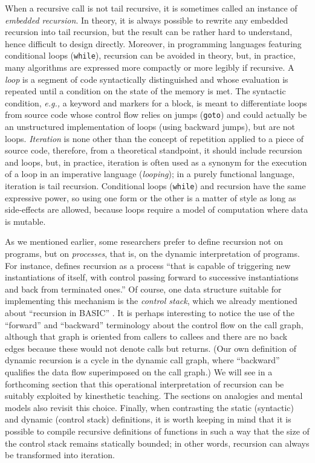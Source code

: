\documentclass[11pt,a4paper]{article}
\newcommand\plang[1]{\textsf{#1}\xspace}
\newcommand\exc[1]{\texttt{\small #1}}
\begin{document}
When a recursive call is not tail recursive, it is sometimes called an
instance of \emph{embedded recursion}. In theory, it is always
possible to rewrite any embedded recursion into tail recursion, but
the result can be rather hard to understand, hence difficult to design
directly. Moreover, in programming languages featuring conditional
loops (\exc{while}), recursion can be avoided in theory, but, in
practice, many algorithms are expressed more compactly or more legibly
if recursive.  A \emph{loop} is a segment of code syntactically
distinguished and whose evaluation is repeated until a condition on
the state of the memory is met. The syntactic condition, \emph{e.g.,}
a keyword and markers for a block, is meant to differentiate loops
from source code whose control flow relies on jumps (\exc{goto}) and
could actually be an unstructured implementation of loops (using
backward jumps), but are not loops. \emph{Iteration} is none other
than the concept of repetition applied to a piece of source code,
therefore, from a theoretical standpoint, it should include recursion
and loops, but, in practice, iteration is often used as a synonym for
the execution of a loop in an imperative language (\emph{looping}); in
a purely functional language, iteration is tail recursion. Conditional
loops (\exc{while}) and recursion have the same expressive power, so
using one form or the other is a matter of style as long as
side\hyp{}effects are allowed, because loops require a model of
computation where data is mutable.

As we mentioned earlier, some researchers prefer to define recursion
not on programs, but on \emph{processes}, that is, on the dynamic
interpretation of programs. For instance, \textcite{Kahney:1983}
defines recursion as a process ``that is capable of triggering new
instantiations of itself, with control passing forward to successive
instantiations and back from terminated ones.'' Of course, one data
structure suitable for implementing this mechanism is the
\emph{control stack}, which we already mentioned about ``recursion in
\plang{BASIC}'' \citep{Daykin:1974}. It is perhaps interesting to
notice the use of the ``forward'' and ``backward'' terminology about
the control flow on the call graph, although that graph is oriented
from callers to callees and there are no back edges because these
would not denote calls but returns. (Our own definition of dynamic
recursion is a cycle in the dynamic call graph, where ``backward''
qualifies the data flow superimposed on the call graph.) We will see
in a forthcoming section that this operational interpretation of
recursion can be suitably exploited by kinesthetic teaching. The
sections on analogies and mental models also revisit this
choice. Finally, when contrasting the static (syntactic) and dynamic
(control stack) definitions, it is worth keeping in mind that it is
possible to compile recursive definitions of functions in such a way
that the size of the control stack remains statically bounded; in
other words, recursion can always be transformed into iteration.
\end{document}
